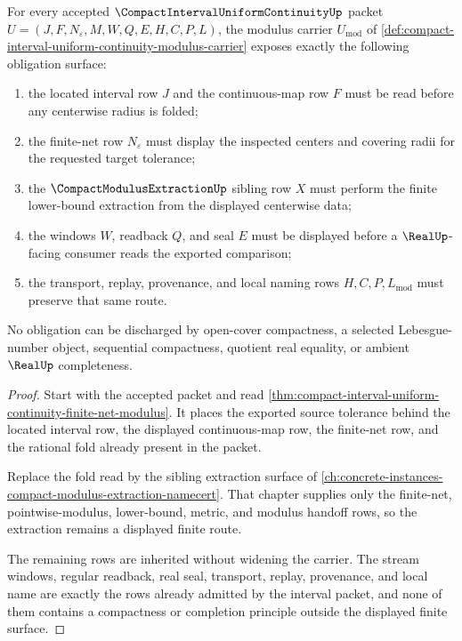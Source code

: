 \begin{theorem}
\label{thm:compact-interval-uniform-continuity-modulus-obligations}
For every accepted $\CompactIntervalUniformContinuityUp$ packet
$U=(J,F,N_\varepsilon,M,W,Q,E,H,C,P,L)$, the modulus carrier
$U_{\mathrm{mod}}$ of
\autoref{def:compact-interval-uniform-continuity-modulus-carrier} exposes
exactly the following obligation surface:
\begin{enumerate}
\item the located interval row $J$ and the continuous-map row $F$ must be read
before any centerwise radius is folded;
\item the finite-net row $N_\varepsilon$ must display the inspected centers
and covering radii for the requested target tolerance;
\item the $\CompactModulusExtractionUp$ sibling row $X$ must perform the
finite lower-bound extraction from the displayed centerwise data;
\item the windows $W$, readback $Q$, and seal $E$ must be displayed before a
$\RealUp$-facing consumer reads the exported comparison;
\item the transport, replay, provenance, and local naming rows $H,C,P,L_{\mathrm{mod}}$
must preserve that same route.
\end{enumerate}
No obligation can be discharged by open-cover compactness, a selected
Lebesgue-number object, sequential compactness, quotient real equality, or
ambient $\RealUp$ completeness.
\end{theorem}
\begin{proof}
Start with the accepted packet and read
\autoref{thm:compact-interval-uniform-continuity-finite-net-modulus}. It places
the exported source tolerance behind the located interval row, the displayed
continuous-map row, the finite-net row, and the rational fold already present
in the packet.

Replace the fold read by the sibling extraction surface of
\autoref{ch:concrete-instances-compact-modulus-extraction-namecert}. That
chapter supplies only the finite-net, pointwise-modulus, lower-bound, metric,
and modulus handoff rows, so the extraction remains a displayed finite route.

The remaining rows are inherited without widening the carrier. The stream
windows, regular readback, real seal, transport, replay, provenance, and local
name are exactly the rows already admitted by the interval packet, and none of
them contains a compactness or completion principle outside the displayed
finite surface.
\end{proof}

